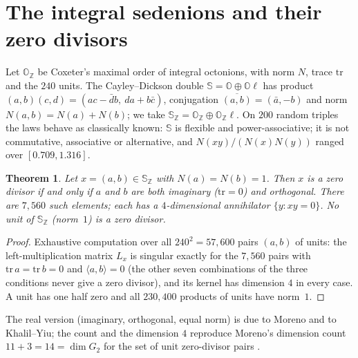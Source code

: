\documentclass[11pt]{amsart}
\newtheorem{theorem}{Theorem}[section]
\theoremstyle{definition}
\renewcommand{\O}{\mathbb{O}}\newcommand{\Sd}{\mathbb{S}}\newcommand{\Hq}{\mathbb{H}}\newcommand{\Z}{\mathbb{Z}}\newcommand{\Q}{\mathbb{Q}}\newcommand{\R}{\mathbb{R}}\newcommand{\C}{\mathbb{C}}\newcommand{\F}{\mathbb{F}}
\begin{document}
\section{The integral sedenions and their zero divisors}\label{sec:zd}
Let $\O_\Z$ be Coxeter's maximal order of integral octonions, with norm $N$, trace $\mathrm{tr}$ and the $240$ units. The Cayley--Dickson double $\Sd=\O\oplus\O\ell$ has product $(a,b)(c,d)=(ac-\bar d b,\ da+b\bar c)$, conjugation $\overline{(a,b)}=(\bar a,-b)$ and norm $N(a,b)=N(a)+N(b)$; we take $\Sd_\Z=\O_\Z\oplus\O_\Z\ell$. On $200$ random triples the laws behave as classically known: $\Sd$ is flexible and power-associative; it is not commutative, associative or alternative, and $N(xy)/(N(x)N(y))$ ranged over $[0.709,1.316]$.

\begin{theorem}\label{thm:zd}
Let $x=(a,b)\in\Sd_\Z$ with $N(a)=N(b)=1$. Then $x$ is a zero divisor if and only if $a$ and $b$ are both imaginary ($\mathrm{tr}=0$) and orthogonal. There are $7{,}560$ such elements; each has a $4$-dimensional annihilator $\{y: xy=0\}$. No unit of $\Sd_\Z$ (norm~$1$) is a zero divisor.
\end{theorem}
\begin{proof}
Exhaustive computation over all $240^2=57{,}600$ pairs $(a,b)$ of units: the left-multiplication matrix $L_x$ is singular exactly for the $7{,}560$ pairs with $\mathrm{tr}\,a=\mathrm{tr}\,b=0$ and $\langle a,b\rangle=0$ (the other seven combinations of the three conditions never give a zero divisor), and its kernel has dimension $4$ in every case. A unit has one half zero and all $230{,}400$ products of units have norm~$1$.
\end{proof}
The real version (imaginary, orthogonal, equal norm) is due to Moreno and to Khalil--Yiu; the count and the dimension $4$ reproduce Moreno's dimension count $11+3=14=\dim G_2$ for the set of unit zero-divisor pairs \cite{Moreno}.
\end{document}
